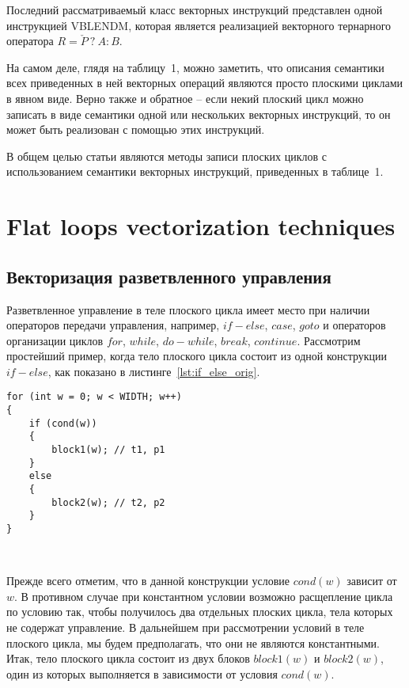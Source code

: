 \documentclass[
11pt,%
tightenlines,%
twoside,%
onecolumn,%
nofloats,%
nobibnotes,%
nofootinbib,%
superscriptaddress,%
noshowpacs,%
centertags]%
{revtex4}
\begin{document}
Последний рассматриваемый класс векторных инструкций представлен одной инструкцией VBLENDM, которая является реализацией векторного тернарного оператора $R = \check{P} \ ? \ A : B$.

На самом деле, глядя на таблицу~1, можно заметить, что описания семантики всех приведенных в ней векторных операций являются просто плоскими циклами в явном виде.
Верно также и обратное -- если некий плоский цикл можно записать в виде семантики одной или нескольких векторных инструкций, то он может быть реализован с помощью этих инструкций.

В общем целью статьи являются методы записи плоских циклов с использованием семантики векторных инструкций, приведенных в таблице~1.

\section{Flat loops vectorization techniques}

\subsection{Векторизация разветвленного управления}

Разветвленное управление в теле плоского цикла имеет место при наличии операторов передачи управления, например, $if-else$, $case$, $goto$ и операторов организации циклов $for$, $while$, $do-while$, $break$, $continue$.
Рассмотрим простейший пример, когда тело плоского цикла состоит из одной конструкции $if-else$, как показано в листинге~\ref{lst:if_else_orig}.

\begin{lstlisting}[caption={Тело плоского цикла, состоящее из конструкции $if-else$.},label={lst:if_else_orig}]
for (int w = 0; w < WIDTH; w++)
{
    if (cond(w))
    {
        block1(w); // t1, p1
    }
    else
    {
        block2(w); // t2, p2
    }
}
\end{lstlisting}

\

Прежде всего отметим, что в данной конструкции условие $cond(w)$ зависит от $w$.
В противном случае при константном условии возможно расщепление цикла по условию так, чтобы получилось два отдельных плоских цикла, тела которых не содержат управление.
В дальнейшем при рассмотрении условий в теле плоского цикла, мы будем предполагать, что они не являются константными.
Итак, тело плоского цикла состоит из двух блоков $block1(w)$ и $block2(w)$, один из которых выполняется в зависимости от условия $cond(w)$.
\end{document}
